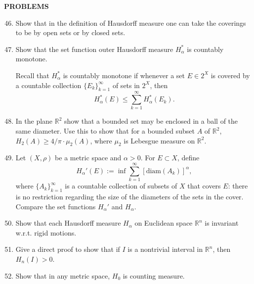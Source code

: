 \begin{center}
	\textbf{PROBLEMS}
\end{center}
\begin{enumerate}
	\setcounter{enumi}{45}
    \item Show that in the definition of Hausdorff measure one can take the coverings to be by open sets or by closed sets.
    

    \item Show that the set function outer Hausdorff measure $H_\alpha^*$ is countably monotone.
    
    Recall that $H_\alpha^*$ is countably monotone if whenever a set $E\in2^X$ is covered by a countable collection $\{E_k\}_{k=1}^\infty$ of sets in $2^X$, then
	\[
		H_\alpha^*(E)\le\sum_{k=1}^\infty H_\alpha^*(E_k).
	\]

    \item In the plane $\mathbb{R}^2$ show that a bounded set may be enclosed in a ball of the same diameter.
    Use this to show that for a bounded subset $A$ of $\mathbb{R}^2$, $H_2(A)\ge4/\pi\cdot\mu_2(A)$, where $\mu_2$ is Lebesgue measure on $\mathbb{R}^2$.
    \item Let $(X,\rho)$ be a metric space and $\alpha>0$.
    For $E\subset X$, define 
    \[
        H_\alpha'(E):=\inf\sum_{k=1}^\infty[\text{diam}(A_k)]^\alpha,
    \]
    where $\{A_k\}_{k=1}^\infty$ is a countable collection of subsets of $X$ that covers $E$: there is no restriction regarding the size of the diameters of the sets in the cover.
    Compare the set functions $H_\alpha'$ and $H_\alpha$.
    \item Show that each Hausdorff measure $H_\alpha$ on Euclidean space $\mathbb{R}^n$ is invariant w.r.t. rigid motions.
    \item Give a direct proof to show that if $I$ is a nontrivial interval in $\mathbb{R}^n$, then $H_n(I)>0$.
    
    
    \item Show that in any metric space, $H_0$ is counting measure.
    

\end{enumerate}
